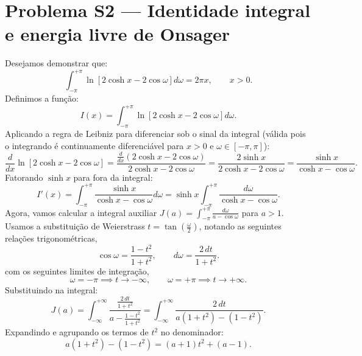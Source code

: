 \documentclass[11pt,a4paper]{article}
\begin{document}
\section*{Problema S2 --- Identidade integral e energia livre de Onsager}
%
Desejamos demonstrar que:
%
\begin{equation}
    \int_{-\pi}^{+\pi} \ln\left[2\cosh x - 2\cos\omega\right] d\omega = 2\pi x, \qquad x>0.
\end{equation}
%
Definimos a função:
%
\begin{equation}
    I(x) = \int_{-\pi}^{+\pi} \ln\left[2\cosh x - 2\cos\omega\right] d\omega.
\end{equation}
%
Aplicando a regra de Leibniz para diferenciar sob o sinal da integral (válida pois o integrando é continuamente diferenciável para $x>0$ e $\omega \in [-\pi,\pi]$):
%
\begin{equation}
    \frac{d}{dx} \ln\left[2\cosh x - 2\cos\omega\right] 
    = \frac{\frac{d}{dx}(2\cosh x - 2\cos\omega)}{2\cosh x - 2\cos\omega} 
    = \frac{2\sinh x}{2\cosh x - 2\cos\omega} 
    = \frac{\sinh x}{\cosh x - \cos\omega}.
\end{equation}
%
Fatorando $\sinh x$ para fora da integral:
%
\begin{equation}
    I'(x) = \int_{-\pi}^{+\pi} \frac{\sinh x}{\cosh x - \cos\omega} d\omega 
    = \sinh x \int_{-\pi}^{+\pi} \frac{d\omega}{\cosh x - \cos\omega}.
\end{equation}
%
Agora, vamos calcular a integral auxiliar $J(a) = \int_{-\pi}^{+\pi} \frac{d\omega}{a - \cos\omega}$ para $a > 1$. Usamos a substituição de Weierstrass $t = \tan\left(\frac{\omega}{2}\right)$, notando as seguintes relações trigonométricas,
%
\begin{equation}
    \cos\omega = \frac{1-t^2}{1+t^2}, \qquad d\omega = \frac{2\,dt}{1+t^2}.
\end{equation}
%
com os seguintes limites de integração,
%
\begin{equation}
        \omega = -\pi \implies t \to -\infty, \qquad \omega = +\pi \implies t \to +\infty.
\end{equation}
%
Substituindo na integral:
%
\begin{equation}
    J(a) = \int_{-\infty}^{+\infty} \frac{\frac{2\,dt}{1+t^2}}{a - \frac{1-t^2}{1+t^2}} 
    = \int_{-\infty}^{+\infty} \frac{2\,dt}{a(1+t^2) - (1-t^2)}.
\end{equation}
%
Expandindo e agrupando os termos de $t^2$ no denominador:
%
\begin{equation}
    a(1+t^2) - (1-t^2) = (a+1)t^2 + (a-1).
\end{equation}
\end{document}
